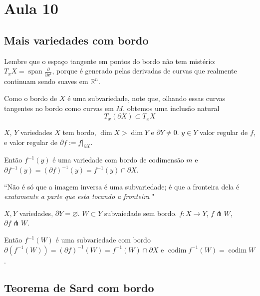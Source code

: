 \section{Aula 10}

\subsection{Mais variedades com bordo}

Lembre que o espaço tangente em pontos do bordo não tem mistério: \(T_xX=\operatorname{span}\frac{\partial }{\partial x^i}\), porque é generado pelas derivadas de curvas que realmente continuam sendo suaves em \( \mathbb{R}^n\).

Como o bordo de \(X\) é uma subvariedade, note que, olhando essas curvas tangentes no bordo como curvas em \(M\), obtemos uma inclusão natural
\[T_x(\partial X)\subset T_x X\]

\begin{prop}\leavevmode
\(X\), \(Y\) variedades \(X\) tem bordo, \(\dim X> \dim Y\) e \(\partial Y \neq  0\). \(y \in Y\) valor regular de \(f\), e valor regular de \(\partial f:= f|_{ \partial X}\).

Então \(f^{-1}(y)\) é uma variedade com bordo de codimensão $m$ e \(\partial f^{-1}(y)=(\partial f)^{-1}(y)=f^{-1}(y) \cap \partial X\).
\end{prop}

``Não é só que a imagem inversa é uma subvariedade; é que a fronteira dela é \textit{exatamente a parte que esta tocando a fronteira} "

\begin{prop}\leavevmode
	\(X,Y\) variedades, \(\partial Y= \varnothing\). \(W \subset Y\) subvaiedade sem bordo. \(f : X \to Y\), \(f \pitchfork W\),  \(\partial f \pitchfork W\).

	Então \(f^{-1}(W)\) é uma subvariedade com bordo \(\partial  (f^{-1}(W)) = (\partial  f)^{-1}(W)= f^{-1}(W) \cap \partial  X\) e \(\operatorname{codim} f^{-1}(W)=\operatorname{codim}W\).
\end{prop}

\subsection{Teorema de Sard com bordo}


